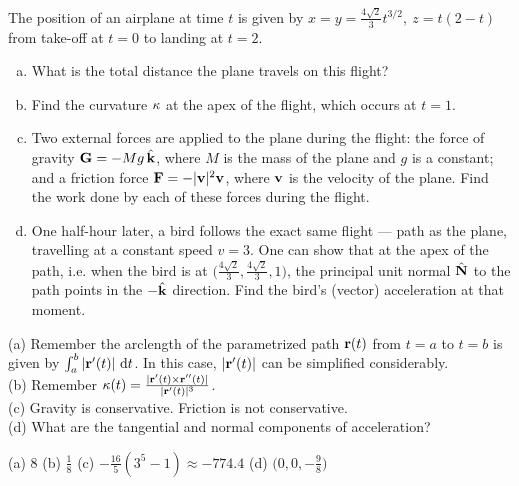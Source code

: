 
\begin{question}[M317 2001D] %
	The position of an airplane at time $t$ is given by
	$
	x=y=\frac{4\sqrt{2}}{3}t^{3/2},\ z=t(2-t)
	$
	from take-off at $t=0$ to landing at $t=2$.
	\begin{enumerate}[(a)]
		\item
		What is the total distance the plane travels on this flight?
		
		\item
		Find the curvature $\kappa$ at the apex of the flight, which occurs
		at $t=1$.
		
		\item
		Two external forces are applied to the plane during the
		flight: the force of gravity $\mathbf{G}=-M g\,\hat{\mathbf{k}}$, where $M$ is the mass of
		the plane and $g$ is a constant; and a friction force $\mathbf{F}=-|\mathbf{v}|^2\mathbf{v}$,
		where $\mathbf{v}$ is the velocity of the plane. Find the work done by each of
		these forces during the flight.
		
		\item
		One half-hour later, a bird follows the exact same flight --- path
		as the plane, travelling at a constant speed $v=3$. One can show that 
		at the apex of the path, i.e. when the bird is at 
		$\big(\frac{4\sqrt{2}}{3},\frac{4\sqrt{2}}{3},1\big)$, the principal
		unit normal $\hat{\mathbf{N}}$ to the path points in the $-\hat{\mathbf{k}}$ direction. Find the bird's (vector)
		acceleration at that moment. 
	\end{enumerate}
\end{question}

\begin{hint}
	(a) Remember the arclength of the parametrized path $\mathbf{r}(t)$ from $t=a$ to $t=b$ is given by $\int_a^b |\vr'(t)|\ \dee{t}$. In this case, $|\mathbf{r}'(t)|$ can be simplified considerably.\\
	(b) Remember $\kappa(t)  = \frac{|\mathbf{r}'(t)\times\mathbf{r}''(t)|}{|\mathbf{r}'(t)|^3}$.\\
	(c) Gravity is conservative. Friction is not conservative.\\	
	(d) What are the tangential and normal components of acceleration? 
\end{hint}

\begin{answer} 
	(a) $8$\qquad
	(b) $\frac{1}{8}$\qquad
	(c) $-\frac{16}{5}(3^5-1)\approx-774.4$\qquad
	(d) $\Big(0,0,-\frac{9}{8}\Big)$
\end{answer}

